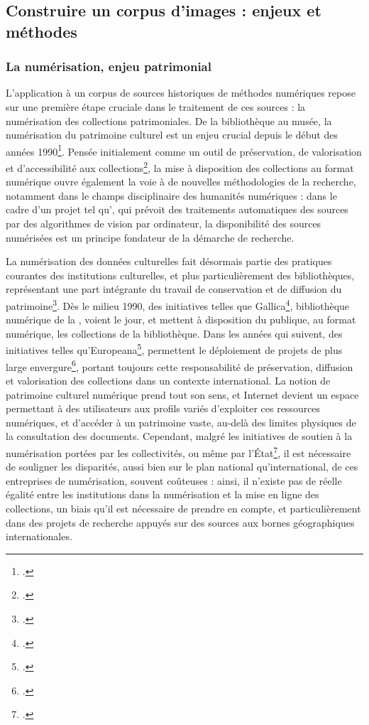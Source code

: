 
\subsection{Construire un corpus d’images : enjeux et méthodes}
        \subsubsection{La numérisation, enjeu patrimonial}
L'application à un corpus de sources historiques de méthodes numériques repose sur une première étape cruciale dans le traitement de ces sources : la numérisation des collections patrimoniales. De la bibliothèque au musée, la numérisation du patrimoine culturel est un enjeu crucial depuis le début des années 1990\footcite{baujardNumerisationPatrimoineCulturel2017}. Pensée initialement comme un outil de préservation, de valorisation et d'accessibilité aux collections\footcite{richardProgrammeNumerisationBibliotheque1993}, la mise à disposition des collections au format numérique ouvre également la voie à de nouvelles méthodologies de la recherche, notamment dans le champs disciplinaire des humanités numériques : dans le cadre d'un projet tel qu'\eida, qui prévoit des traitements automatiques des sources par des algorithmes de vision par ordinateur, la disponibilité des sources numérisées est un principe fondateur de la démarche de recherche. 

La numérisation des données culturelles fait désormais partie des pratiques courantes des institutions culturelles, et plus particulièrement des bibliothèques, représentant une part intégrante du travail de conservation et de diffusion du patrimoine\footcite{claerrModeEmploi2017}. Dès le milieu 1990, des initiatives telles que Gallica\footcite{Gallica}, bibliothèque numérique de la \bnf, voient le jour, et mettent à disposition du publique, au format numérique, les collections de la bibliothèque. Dans les années qui suivent, des initiatives telles qu'Europeana\footcite{Europeana}, permettent le déploiement de projets de plus large envergure\footcite{claerrModeEmploi2017}, portant toujours cette responsabilité de préservation, diffusion et valorisation des collections dans un contexte international. La notion de patrimoine culturel numérique prend tout son sens, et Internet devient un espace permettant à des utilisateurs aux profils variés d'exploiter ces ressources numériques, et d'accéder à un patrimoine vaste, au-delà des limites physiques de la consultation des documents. Cependant, malgré les initiatives de soutien à la numérisation portées par les collectivités, ou même par l'État\footcite{claerrModeEmploi2017}, il est nécessaire de souligner les disparités, aussi bien sur le plan national qu'international, de ces entreprises de numérisation, souvent coûteuses : ainsi, il n'existe pas de réelle égalité entre les institutions dans la numérisation et la mise en ligne des collections, un biais qu'il est nécessaire de prendre en compte, et particulièrement dans des projets de recherche appuyés sur des sources aux bornes géographiques internationales. 


